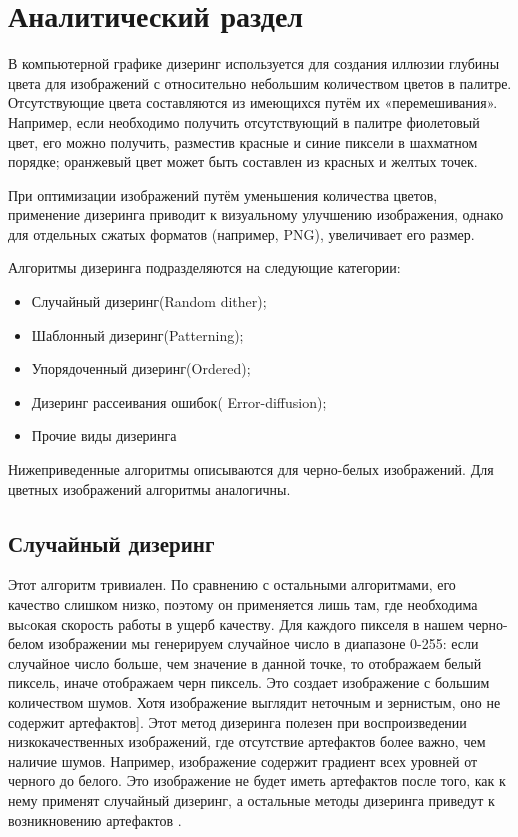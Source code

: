 \chapter{Аналитический раздел}
\label{cha:analysis}
%
%
В компьютерной графике дизеринг используется для создания иллюзии глубины цвета для изображений с относительно небольшим количеством цветов в палитре. Отсутствующие цвета составляются из имеющихся путём их «перемешивания». Например, если необходимо получить отсутствующий в палитре фиолетовый цвет, его можно получить, разместив красные и синие пиксели в шахматном порядке; оранжевый цвет может быть составлен из красных и желтых точек.

При оптимизации изображений путём уменьшения количества цветов, применение дизеринга приводит к визуальному улучшению изображения, однако для отдельных сжатых форматов (например, PNG), увеличивает его размер.


Алгоритмы дизеринга подразделяются на следующие категории:

\begin{itemize}
	\item Случайный  дизеринг(Random dither);
	\item Шаблонный дизеринг(Patterning);
	\item Упорядоченный дизеринг(Ordered);
	\item Дизеринг рассеивания ошибок( Error-diffusion);
	\item Прочие виды дизеринга
	
\end{itemize}

Нижеприведенные алгоритмы описываются для черно-белых изображений. Для цветных изображений алгоритмы аналогичны.




\section{Случайный дизеринг}
Этот алгоритм тривиален.  По сравнению с остальными алгоритмами, его качество слишком низко, поэтому он применяется лишь там, где необходима  выcокая скорость работы в ущерб качеству.\cite{Dh} 
Для каждого пикселя в нашем черно-белом изображении мы генерируем случайное число в диапазоне 0-255: если случайное число больше, чем значение в данной точке, то отображаем белый пиксель, иначе отображаем черн пиксель.
Это создает изображение с большим количеством шумов. Хотя изображение выглядит неточным и зернистым, оно не содержит артефактов\cite{Dh}]. Этот метод дизеринга полезен при воспроизведении низкокачественных изображений, где отсутствие артефактов более важно, чем наличие шумов. Например, изображение содержит градиент всех уровней от черного до белого. Это изображение не будет иметь артефактов после того, как к нему применят случайный дизеринг, а остальные методы дизеринга приведут к возникновению артефактов \cite{Dh}. 

